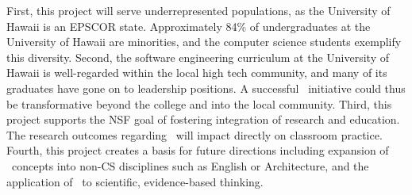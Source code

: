 \medskip 

  First, this project will serve
underrepresented populations, as the University of Hawaii is an EPSCOR
state. Approximately 84\% of undergraduates at the University of Hawaii are
minorities, and the computer science students exemplify this diversity.
Second, the software engineering curriculum at the University of Hawaii is
well-regarded within the local high tech community, and many of its
graduates have gone on to leadership positions. A successful \eCT\
initiative could thus be transformative beyond the college and into the
local community.  Third, this project supports the NSF goal of fostering
integration of research and education.  The research outcomes regarding
\eCT\ will impact directly on classroom practice.  Fourth, this project
creates a basis for future directions including expansion of \eCT\ concepts
into non-CS disciplines such as English or Architecture, and the
application of \eCT\ to scientific, evidence-based thinking.

